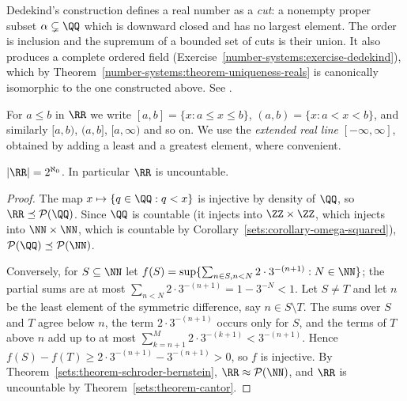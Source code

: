 \begin{remark}\label{number-systems:remark-dedekind-cuts}
Dedekind's construction \cite{dedekind-1872} defines a real number as a
\emph{cut}: a nonempty proper subset $\alpha \subsetneq \QQ$ which is downward
closed and has no largest element. The order is inclusion and the supremum of
a bounded set of cuts is their union. It also produces a complete ordered
field (Exercise~\ref{number-systems:exercise-dedekind}), which by
Theorem~\ref{number-systems:theorem-uniqueness-reals} is canonically isomorphic
to the one constructed above. See \cite[Appendix to Chapter 1]{rudin-principles}.
\end{remark}

\begin{notation}\label{number-systems:notation-intervals}
For $a \leq b$ in $\RR$ we write $[a, b] = \{x : a \leq x \leq b\}$,
$(a, b) = \{x : a < x < b\}$, and similarly $[a, b)$, $(a, b]$, $[a, \infty)$ and so
on. We use the \emph{extended real line} $[-\infty, \infty]$, obtained by adding a
least and a greatest element, where convenient.
\end{notation}

\begin{proposition}\label{number-systems:proposition-reals-cardinality}
$|\RR| = 2^{\aleph_0}$. In particular $\RR$ is uncountable.
\end{proposition}

\begin{proof}
The map $x \mapsto \{q \in \QQ : q < x\}$ is injective by density of $\QQ$, so
$\RR \preceq \mathcal{P}(\QQ)$. Since $\QQ$ is countable (it injects into
$\ZZ \times \ZZ$, which injects into $\NN \times \NN$, which is countable by
Corollary~\ref{sets:corollary-omega-squared}), $\mathcal{P}(\QQ) \preceq \mathcal{P}(\NN)$.

Conversely, for $S \subseteq \NN$ let
$f(S) = \sup\{\sum_{n \in S, n < N} 2 \cdot 3^{-(n+1)} : N \in \NN\}$; the partial sums
are at most $\sum_{n < N} 2 \cdot 3^{-(n+1)} = 1 - 3^{-N} < 1$. Let $S \neq T$ and let
$n$ be the least element of the symmetric difference, say $n \in S \setminus T$.
The sums over $S$ and $T$ agree below $n$, the term $2 \cdot 3^{-(n+1)}$ occurs
only for $S$, and the terms of $T$ above $n$ add up to at most
$\sum_{k = n+1}^{M} 2 \cdot 3^{-(k+1)} < 3^{-(n+1)}$. Hence
$f(S) - f(T) \geq 2 \cdot 3^{-(n+1)} - 3^{-(n+1)} > 0$, so $f$ is injective. By
Theorem~\ref{sets:theorem-schroder-bernstein}, $\RR \approx \mathcal{P}(\NN)$, and
$\RR$ is uncountable by Theorem~\ref{sets:theorem-cantor}.
\end{proof}

